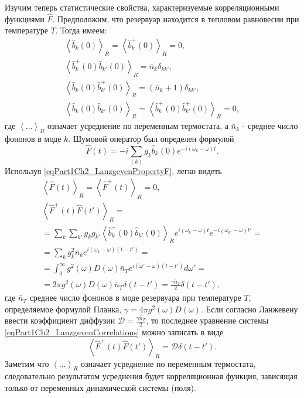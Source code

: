 Изучим теперь статистические свойства, характеризуемые корреляционными
функциями $\hat{F}$. Предположим, что резервуар находится в тепловом
равновесии при температуре $T$. Тогда имеем:
\begin{eqnarray}
\left<\hat{b}_k\left(0\right)\right>_R = 
\left<\hat{b}_k^{+}\left(0\right)\right>_R = 0, 
\nonumber \\
\left<\hat{b}_k^{+}\left(0\right)\hat{b}_{k'}\left(0\right)\right>_R = 
\bar{n}_k \delta_{k k'},
\nonumber \\
\left<\hat{b}_k\left(0\right)\hat{b}_{k'}^{+}\left(0\right)\right>_R = 
\left(\bar{n}_k + 1\right)\delta_{k k'},
\nonumber \\
\left<\hat{b}_k\left(0\right)\hat{b}_{k'}\left(0\right)\right>_R = 
\left<\hat{b}_k^{+}\left(0\right)\hat{b}_{k'}^{+}\left(0\right)\right>_R
= 0,
\label{eqPart1Ch2_LanzgevenPropertyF}
\end{eqnarray}
где $\left<\dots\right>_R$ означает усреднение по переменным
термостата, а $\bar{n}_k$ - среднее число фононов в моде $k$. Шумовой
оператор был определен формулой 
\begin{equation}
\hat{F}\left(t\right) = -i \sum_{(k)}g_k 
\hat{b}_k\left(0\right)
e^{-i \left(\omega_k - \omega\right)t}.
\label{eqPart1Ch2_LanzgevenDefenitionF}
\end{equation}
Используя \eqref{eqPart1Ch2_LanzgevenPropertyF}, легко видеть
\begin{eqnarray}
\left<\hat{F}\left(t\right)\right>_R =
\left<\hat{F}^{+}\left(t\right)\right>_R  = 0,
\nonumber \\
\left<\hat{F}^{+}\left(t\right)\hat{F}\left(t'\right)\right>_R = 
\nonumber \\
= \sum_{k}\sum_{k'}g_k g_{k'}
\left<\hat{b}_k^{+}\left(0\right)\hat{b}_{k'}\left(0\right)\right>_R 
e^{i\left(\omega_k - \omega\right)t} 
 e^{-i\left(\omega_{k'} - \omega\right)t'} =
\nonumber \\
= \sum_{k}g_k^2 \bar{n}_k 
e^{i\left(\omega_k - \omega\right)\left(t - t'\right)} = 
\nonumber \\
=
\int_0^\infty
g^2\left(\omega\right)D\left(\omega\right)\bar{n}_T
e^{i\left(\omega' - \omega\right)\left(t - t'\right)}d \omega' = 
\nonumber \\
= 2 \pi
g^2\left(\omega\right)D\left(\omega\right)\bar{n}_T
\delta\left(t - t'\right) =
\frac{\gamma \bar{n}_{T}}{2} \delta\left(t - t'\right),
\label{eqPart1Ch2_LanzgevenCorrelations}
\end{eqnarray}
где $\bar{n}_T$ среднее число фононов в моде резервуара при
температуре $T$, определяемое формулой Планка,
$\gamma = 4 \pi g^2\left(\omega\right)D\left(\omega\right)$.
Если согласно Ланжевену ввести коэффициент диффузии $\mathcal{D} =
\frac{\gamma \bar{n}_{T}}{2}$, то последнее уравнение системы
\eqref{eqPart1Ch2_LanzgevenCorrelations} можно записать в виде
\begin{equation}
\left<\hat{F}^{+}\left(t\right)\hat{F}\left(t'\right)\right>_R = 
\mathcal{D} \delta\left(t - t'\right). 
\nonumber
\end{equation}
Заметим что $\left<\dots\right>_R$ означает усреднение по переменным
термостата, следовательно результатом усреднения будет корреляционная
функция, зависящая только от переменных динамической системы (поля).


